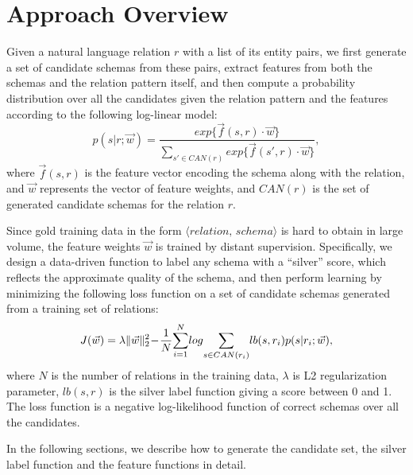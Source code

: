 \section{Approach Overview}
\label{sec:approach}

Given a natural language relation $r$ with a list of its entity pairs,
we first generate a set of candidate schemas from these pairs, 
extract features from both the schemas and the relation pattern itself, 
and then compute a probability distribution over all the candidates 
given the relation pattern and the features according to the 
following log-linear model:
\begin{equation}
  p(s|r; \vec{w}) = 
    \frac { 
      exp \{ \vec{f} (s, r) \cdot \vec{w} \} 
    } { 
	  \sum\limits_{s' \in CAN(r)} { 
	    exp \{ \vec{f} (s', r) \cdot \vec{w} \} 
	  }
    },
\end{equation}
\noindent
where $\vec{f} (s, r)$ is the feature vector encoding the schema
along with the relation, and $\vec{w}$ represents the vector of
feature weights, and $CAN(r)$ is the set of generated candidate schemas for 
the relation $r$.

Since gold training data in the form $\langle relation,\, schema \rangle$
is hard to obtain in large volume, the feature weights $\vec{w}$ is trained
by distant supervision. Specifically, we design a data-driven function 
to label any schema with a ``silver'' score, which reflects the 
approximate quality of the schema, and then perform learning by minimizing 
the following loss function on a set of candidate
schemas generated from a training set of relations:
\begin{equation}
\small
J(\vec{w}) = \lambda \| \vec{w} \|_2^2 \! - \!  
  \frac {1} {N} \! 
  \sum\limits_{i=1}^{N} {
    \! log \! \sum\limits_{s \in CAN(r_i)} { 
	  \! lb(s, r_i) p(s|r_i; \vec{w}) 
	}
  },
\end{equation}
\noindent
where $N$ is the number of relations in the training data,
$\lambda$ is L2 regularization parameter, 
$lb(s, r)$ is the silver label function giving a score between 0 and 1. 
The loss function is a negative log-likelihood function 
of correct schemas over all the candidates.

In the following sections, we describe how to generate the candidate
set, the silver label function and the feature functions in detail.





